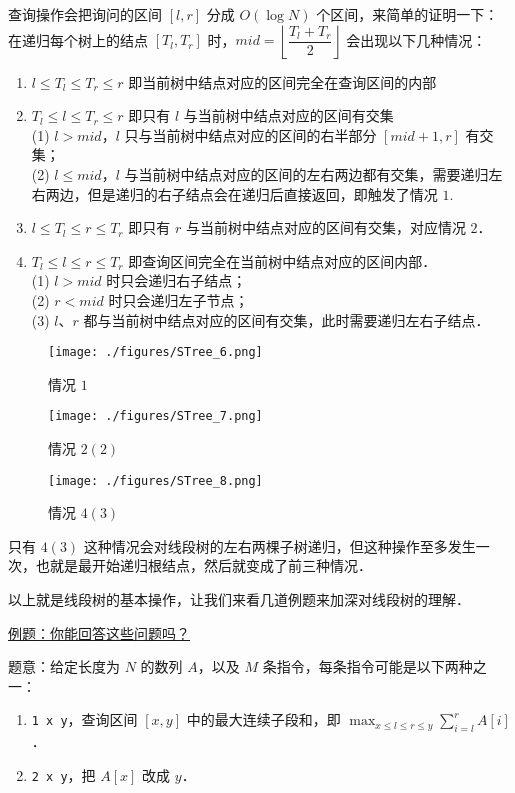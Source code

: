 查询操作会把询问的区间 $[l, r]$ 分成 $O(\log N)$ 个区间，来简单的证明一下：
在递归每个树上的结点 $[T_l, T_r]$ 时，$mid = \left\lfloor\dfrac{T_l+T_r}{2}\right\rfloor$ 会出现以下几种情况：

\begin{enumerate}
\item $l \leq T_l \leq T_r \leq r$ 即当前树中结点对应的区间完全在查询区间的内部
\item $T_l \leq l \leq T_r \leq r$ 即只有 $l$ 与当前树中结点对应的区间有交集\\
      (1) $l > mid$，$l$ 只与当前树中结点对应的区间的右半部分 $[mid + 1, r]$ 有交集； \\
      (2) $l \leq mid$，$l$ 与当前树中结点对应的区间的左右两边都有交集，需要递归左右两边，但是递归的右子结点会在递归后直接返回，即触发了情况 $1$.\\
\item $l \leq T_l \leq r \leq T_r$ 即只有 $r$ 与当前树中结点对应的区间有交集，对应情况 $2$．
\item $T_l \leq l \leq r \leq T_r$ 即查询区间完全在当前树中结点对应的区间内部．\\
      (1) $l > mid$ 时只会递归右子结点； \\
      (2) $r < mid$ 时只会递归左子节点； \\
      (3) $l$、$r$ 都与当前树中结点对应的区间有交集，此时需要递归左右子结点． \\

\end{enumerate}

\begin{figure}[ht]
\centering
\texttt{[image: ./figures/STree\_6.png]}
\caption{情况 $1$} \label{STree_fig6}
\end{figure}

\begin{figure}[ht]
\centering
\texttt{[image: ./figures/STree\_7.png]}
\caption{情况 $2(2)$} \label{STree_fig7}
\end{figure}

\begin{figure}[ht]
\centering
\texttt{[image: ./figures/STree\_8.png]}
\caption{情况 $4(3)$} \label{STree_fig8}
\end{figure}



只有 $4(3)$ 这种情况会对线段树的左右两棵子树递归，但这种操作至多发生一次，也就是最开始递归根结点，然后就变成了前三种情况．

以上就是线段树的基本操作，让我们来看几道例题来加深对线段树的理解．

\href{https://www.spoj.com/problems/GSS3/}{例题：你能回答这些问题吗？}

题意：给定长度为 $N$ 的数列 $A$，以及 $M$ 条指令，每条指令可能是以下两种之一：
\begin{enumerate}
\item \verb|1 x y|，查询区间 $[x,y]$ 中的最大连续子段和，即 $\max_{x\leq l \leq r \leq y}{\sum^{r} _ {i = l}A[i]}$．
\item \verb|2 x y|，把 $A[x]$ 改成 $y$．
\end{enumerate}

